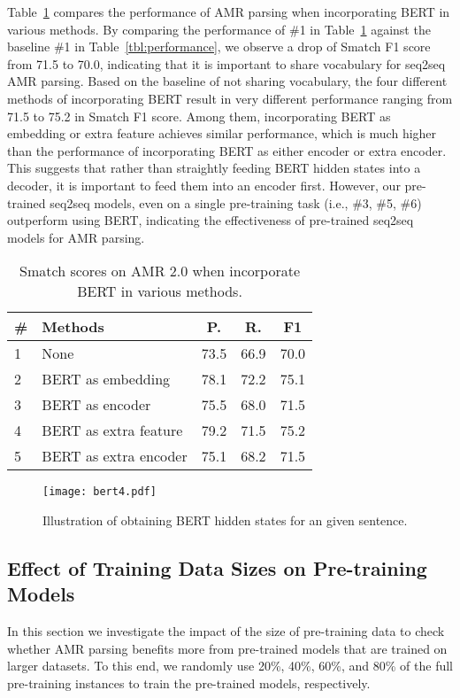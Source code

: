 \documentclass[11pt,a4paper]{article}
\newcommand{\ignore}[1]{}
\begin{document}
Table~\ref{tbl:bert} compares the performance of AMR  parsing when incorporating BERT in various methods. By comparing the performance of \#1 in Table~\ref{tbl:bert} against the baseline \#1 in Table~\ref{tbl:performance}, we observe a drop of Smatch F1 score from 71.5 to 70.0, indicating that it is important to share vocabulary for seq2seq AMR parsing. Based on the baseline of not sharing vocabulary, the four different methods of incorporating BERT result in very different performance ranging from 71.5 to 75.2 in Smatch F1 score. Among them, incorporating BERT as embedding or extra feature\ignore{, as recent studies~\cite{zhang_etal_acl_2019,cai_lam_acl_2020} do,} achieves similar performance, which is much higher than the performance of incorporating BERT as either encoder or extra encoder. This suggests that rather than straightly feeding BERT hidden states into a decoder, it is important to feed them into an encoder first. However, our pre-trained seq2seq models, even on a single pre-training task (i.e., \#3, \#5, \#6) outperform using BERT, indicating the effectiveness of pre-trained seq2seq models for AMR parsing.

\begin{table}[t]
    \centering
    \begin{tabular}{l|l|ccc}
    \hline 
    \bf \# & \bf Methods & \bf P. & \bf R. & \bf F1\\
    \hline
        1 & None &  73.5 & 66.9 & 70.0 \\
         \hline
2 & BERT as embedding &  78.1 & 72.2 & 75.1\\
3 & BERT as encoder&  75.5 & 68.0 & 71.5 \\
4 & BERT as extra feature&  79.2 & 71.5 & 75.2 \\
5 & BERT as extra encoder &  75.1 & 68.2 & 71.5 \\
         \hline
    \end{tabular}
    \caption{Smatch scores on AMR 2.0 when incorporate BERT in various methods.}
    \label{tbl:bert}
\end{table}

\begin{figure}[t]
\begin{center}
\texttt{[image: bert4.pdf]}
\end{center}
\caption{Illustration of obtaining BERT hidden states for an given sentence.} 
\label{fig:bert}
\end{figure}

\subsection{Effect of Training Data Sizes on Pre-training Models}
In this section we investigate the impact of the size of pre-training data to check whether AMR parsing benefits more from pre-trained models that are trained on larger datasets. To this end, we randomly use 20\%, 40\%, 60\%, and 80\% of the full pre-training instances to train the pre-trained models, respectively. 
\end{document}
